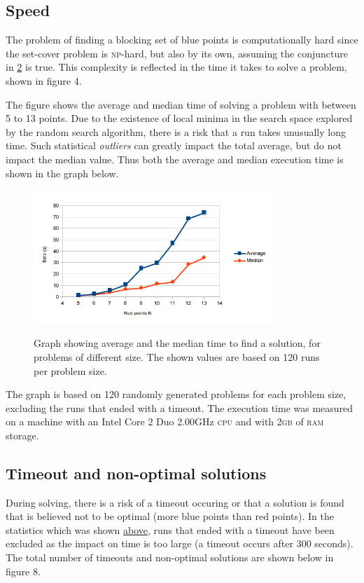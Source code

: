 \documentclass[a4paper,12pt]{article}
\begin{document}
\subsection{Speed}
\label{speed}
The problem of finding a blocking set of blue points is computationally hard since the set-cover problem is \textsc{np}-hard, but also by its own, assuming the conjuncture in \hyperref[ref:blocking]{2} is true. This complexity is reflected in the time it takes to solve a problem, shown in figure 4.

The figure shows the average and median time of solving a problem with between 5 to 13 points. Due to the existence of local minima in the search space explored by the random search algorithm, there is a risk that a run takes unusually long time. Such statistical \emph{outliers} can greatly impact the total average, but do not impact the median value. Thus both the average and median execution time is shown in the graph below.

\begin{figure}[h]
\begin{center}
\label{ref:speed}
\includegraphics[width=0.8\textwidth]{pictures/speedStats.png}
 \caption[Close up of \textit{Hemidactylus} sp.]
   {Graph showing average and the median time to find a solution, for problems of different size. The shown values are based on 120 runs per problem size.}
\end{center}
\end{figure}


The graph is based on 120 randomly generated problems for each problem size, excluding the runs that ended with a timeout. The execution time was measured on a machine with an Intel Core 2 Duo 2.00GHz \textsc{cpu} and with 2\textsc{gb} of \textsc{ram} storage.

\subsection{Timeout and non-optimal solutions}
During solving, there is a risk of a timeout occuring or that a solution is found that is believed not to be optimal (more blue points than red points). In the statistics which was shown \hyperref[sec:speed]{above}, runs that ended with a timeout have been excluded as the impact on time is too large (a timeout occurs after 300 seconds). The total number of timeouts and non-optimal solutions are shown below in figure 8.
\end{document}
